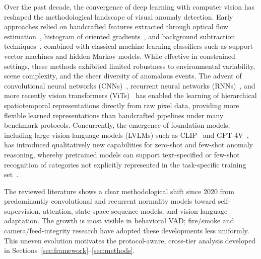 \documentclass[10pt,a4paper]{article}
\begin{document}
Over the past decade, the convergence of deep learning with computer vision has reshaped the methodological landscape of visual anomaly detection. Early approaches relied on handcrafted features extracted through optical flow estimation~\citep{horn1981determining}, histogram of oriented gradients~\citep{dalal2005histograms}, and background subtraction techniques~\citep{stauffer1999adaptive}, combined with classical machine learning classifiers such as support vector machines and hidden Markov models. While effective in constrained settings, these methods exhibited limited robustness to environmental variability, scene complexity, and the sheer diversity of anomalous events. The advent of convolutional neural networks (CNNs)~\citep{lecun2015deep}, recurrent neural networks (RNNs)~\citep{hochreiter1997long}, and more recently vision transformers (ViTs)~\citep{dosovitskiy2020image} has enabled the learning of hierarchical spatiotemporal representations directly from raw pixel data, providing more flexible learned representations than handcrafted pipelines under many benchmark protocols. Concurrently, the emergence of foundation models, including large vision-language models (LVLMs) such as CLIP~\citep{radford2021learning} and GPT-4V~\citep{achiam2023gpt}, has introduced qualitatively new capabilities for zero-shot and few-shot anomaly reasoning, whereby pretrained models can support text-specified or few-shot recognition of categories not explicitly represented in the task-specific training set~\citep{wu2024vadclip, zanella2024harnessing}.

The reviewed literature shows a clear methodological shift since 2020 from predominantly convolutional and recurrent normality models toward self-supervision, attention, state-space sequence models, and vision-language adaptation. The growth is most visible in behavioral VAD; fire/smoke and camera/feed-integrity research have adopted these developments less uniformly. This uneven evolution motivates the protocol-aware, cross-tier analysis developed in Sections~\ref{sec:framework}--\ref{sec:methods}.
\end{document}
